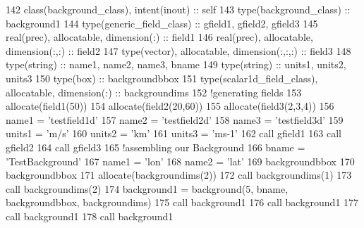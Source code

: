 \begin{DoxyCode}
142     \textcolor{keywordtype}{class}(background\_class), \textcolor{keywordtype}{intent(inout)} :: self
143     \textcolor{keywordtype}{type}(background\_class) :: background1
144     \textcolor{keywordtype}{type}(generic\_field\_class) :: gfield1, gfield2, gfield3
145     \textcolor{keywordtype}{real(prec)}, \textcolor{keywordtype}{allocatable}, \textcolor{keywordtype}{dimension(:)} :: field1
146     \textcolor{keywordtype}{real(prec)}, \textcolor{keywordtype}{allocatable}, \textcolor{keywordtype}{dimension(:,:)} :: field2
147     \textcolor{keywordtype}{type}(vector), \textcolor{keywordtype}{allocatable}, \textcolor{keywordtype}{dimension(:,:,:)} :: field3
148     \textcolor{keywordtype}{type}(string) :: name1, name2, name3, bname
149     \textcolor{keywordtype}{type}(string) :: units1, units2, units3
150     \textcolor{keywordtype}{type}(box) :: backgroundbbox
151     \textcolor{keywordtype}{type}(scalar1d\_field\_class), \textcolor{keywordtype}{allocatable}, \textcolor{keywordtype}{dimension(:)} :: backgroundims
152     \textcolor{comment}{!generating fields}
153     \textcolor{keyword}{allocate}(field1(50))
154     \textcolor{keyword}{allocate}(field2(20,60))
155     \textcolor{keyword}{allocate}(field3(2,3,4))
156     name1 = \textcolor{stringliteral}{'testfield1d'}
157     name2 = \textcolor{stringliteral}{'testfield2d'}
158     name3 = \textcolor{stringliteral}{'testfield3d'}
159     units1 = \textcolor{stringliteral}{'m/s'}
160     units2 = \textcolor{stringliteral}{'km'}
161     units3 = \textcolor{stringliteral}{'ms-1'}
162     \textcolor{keyword}{call }gfield1%
163     \textcolor{keyword}{call }gfield2%
164     \textcolor{keyword}{call }gfield3%
165     \textcolor{comment}{!assembling our Background}
166     bname = \textcolor{stringliteral}{'TestBackground'}
167     name1 = \textcolor{stringliteral}{'lon'}
168     name2 = \textcolor{stringliteral}{'lat'}
169     backgroundbbox%
170     backgroundbbox%
171     \textcolor{keyword}{allocate}(backgroundims(2))
172     \textcolor{keyword}{call }backgroundims(1)%
173     \textcolor{keyword}{call }backgroundims(2)%
174     background1 = background(5, bname, backgroundbbox, backgroundims)
175     \textcolor{keyword}{call }background1%
176     \textcolor{keyword}{call }background1%
177     \textcolor{keyword}{call }background1%
178     \textcolor{keyword}{call }background1%
\end{DoxyCode}
